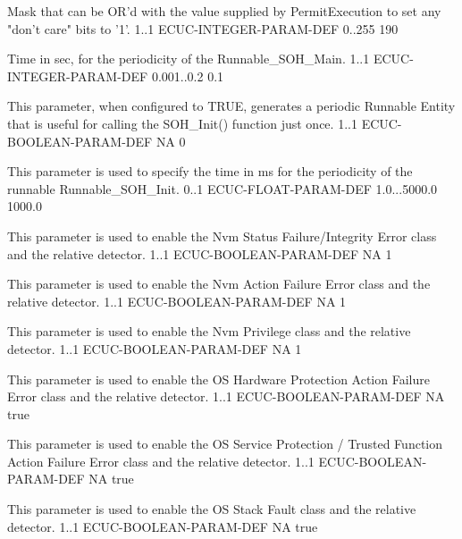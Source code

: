 {   
    {Mask that can be OR'd with the value supplied by PermitExecution to set any "don't care" bits to '1'.}
    {1..1}
    {ECUC-INTEGER-PARAM-DEF}
    {0..255}
    {190}
}

{
    {Time in sec, for the periodicity of the Runnable_SOH_Main.}
    {1..1}
    {ECUC-INTEGER-PARAM-DEF}
    {0.001..0.2}
    {0.1}
}

{
    {This parameter, when configured to TRUE, generates a periodic Runnable Entity that is useful for calling the SOH_Init() function just once.}
    {1..1}
    {ECUC-BOOLEAN-PARAM-DEF}
    {NA}
    {0}
}


{
    {This parameter is used to specify the time in ms for the periodicity of the runnable Runnable_SOH_Init.}
    {0..1}
    {ECUC-FLOAT-PARAM-DEF}
    {1.0...5000.0}
    {1000.0}
}

{
}


{
{This parameter is used to enable the Nvm Status Failure/Integrity Error class and the relative detector.}
{1..1}
{ECUC-BOOLEAN-PARAM-DEF}
{NA}
{1}}

{
{This parameter is used to enable the Nvm Action Failure Error class and the relative detector.}
{1..1}
{ECUC-BOOLEAN-PARAM-DEF}
{NA}
{1}}

{
{This parameter is used to enable the Nvm Privilege class and the relative detector.}
{1..1}
{ECUC-BOOLEAN-PARAM-DEF}
{NA}
{1}}

{
    {This parameter is used to enable the OS Hardware Protection Action Failure Error class and the relative detector.}
    {1..1}
    {ECUC-BOOLEAN-PARAM-DEF}
    {NA}
    {true}
}


{
    {This parameter is used to enable the OS Service Protection / Trusted Function Action Failure Error class and the relative detector.}
    {1..1}
    {ECUC-BOOLEAN-PARAM-DEF}
    {NA}
    {true}
}

{
    {This parameter is used to enable the OS Stack Fault class and the relative detector.}
    {1..1}
    {ECUC-BOOLEAN-PARAM-DEF}
    {NA}
    {true}
}

